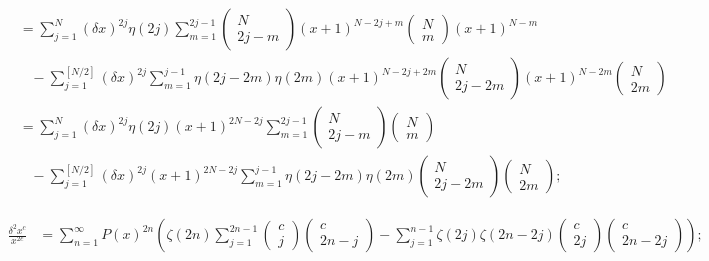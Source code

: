 \documentclass[twoside]{article}
\numberwithin{equation}{section}
\newcommand{\eqspace}{\;\;\;}
\begin{document}
\begin{align*}
 &= \sum_{j=1}^{N} (\delta x)^{2j} \eta(2j) 
        \sum_{m=1}^{2j - 1} \begin{pmatrix} N \\ 2j - m \end{pmatrix} (x + 1)^{N - 2j + m} \begin{pmatrix} N \\ m \end{pmatrix} (x + 1)^{N-m} \\
   &\eqspace -  \sum_{j=1}^{[N/2]} (\delta x)^{2j} \sum_{m=1}^{j - 1} \eta(2j - 2m) \eta(2m) 
		(x + 1)^{N - 2j + 2m} \begin{pmatrix} N \\ 2j - 2m \end{pmatrix} (x + 1)^{N - 2m} \begin{pmatrix} N \\ 2m \end{pmatrix} \\
 &= \sum_{j=1}^{N} (\delta x)^{2j} \eta(2j) (x + 1)^{2N - 2j}
        \sum_{m=1}^{2j - 1} \begin{pmatrix} N \\ 2j - m \end{pmatrix} \begin{pmatrix} N \\ m \end{pmatrix} \\
   &\eqspace -  \sum_{j=1}^{[N/2]} (\delta x)^{2j}  (x + 1)^{2N - 2j} \sum_{m=1}^{j - 1} \eta(2j - 2m) \eta(2m) 
		\begin{pmatrix} N \\ 2j - 2m \end{pmatrix} \begin{pmatrix} N \\ 2m \end{pmatrix};
\end{align*}

\begin{align*}
\frac{\delta^2 x^c}{x^{2c}} &= \sum_{n=1}^{\infty} P(x)^{2n} 
 \left( \zeta(2n) \sum_{j=1}^{2n-1} \begin{pmatrix} c \\ j \end{pmatrix} \begin{pmatrix} c \\ 2n - j \end{pmatrix}
 - \sum_{j=1}^{n-1} \zeta(2j) \zeta(2n - 2j) \begin{pmatrix} c \\ 2j \end{pmatrix} \begin{pmatrix} c \\ 2n -2 j \end{pmatrix}  \right);
\end{align*}
\end{document}
